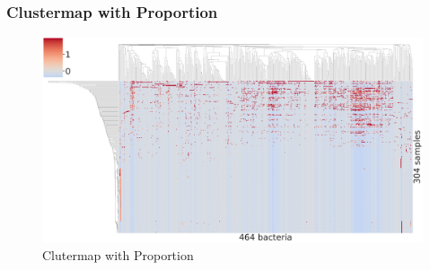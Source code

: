 \documentclass{beamer}
\begin{document}
    \begin{frame}
        \frametitle{Clustermap with Proportion}

        \begin{figure}
            \includegraphics[width=0.8 \linewidth]{figures/Step55_Proportion/everything.DADA2.homd.uncorrected.pdf}
            \caption{Clutermap with Proportion}
        \end{figure}
    \end{frame}
\end{document}
